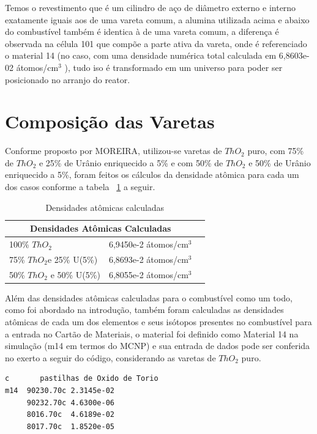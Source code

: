 \documentclass[
	12pt,				%
	openany,			%
	twoside,			%
	a4paper,			%
	english,			%
	french,				%
	spanish,			%
	brazil				%
	]{abntex2}
\begin{document}
Temos o revestimento que é um cilindro de aço de diâmetro externo e interno exatamente iguais aos de uma vareta comum, a alumina utilizada acima e abaixo do combustível também é identica à de uma vareta comum, a diferença é observada na célula 101 que compõe a parte ativa da vareta, onde é referenciado o material 14 (no caso, com uma densidade numérica total calculada em 6,8603e-02 átomos/cm$^3$ ), tudo iso é transformado em um universo para poder ser posicionado no arranjo do reator.

\section{Composição das Varetas}

Conforme proposto por MOREIRA, utilizou-se varetas de $ThO_{2}$ puro,
com 75\% de $ThO_{2}$ e 25\% de Urânio enriquecido a 5\% e com 50\%
de $ThO_{2}$ e 50\% de Urânio enriquecido a 5\%, foram feitos os
cálculos da densidade atômica para cada um dos casos conforme a tabela
~\ref{DENSIDADES_ATOMICAS} a seguir.

\begin{center}
\begin{longtable}{|l|l|l|}
\caption[Densidades atômicas calculadas]{Densidades atômicas calculadas}

\label{DENSIDADES_ATOMICAS} \\

\hline
\multicolumn{2}{|c|}{Densidades Atômicas Calculadas}\tabularnewline
\hline 
\hline 
100\% $ThO_{2}$ & 6,9450e-2 átomos/cm$^3${}\tabularnewline
\hline 
75\% $ThO_{2}$e 25\% U(5\%) & 6,8693e-2 átomos/cm$^3${}\tabularnewline
\hline 
50\% $ThO_{2}$ e 50\% U(5\%) & 6,8055e-2 átomos/cm$^3${}\tabularnewline
\hline 
\end{longtable}
\end{center}

Além das densidades atômicas calculadas para o combustível como um
todo, como foi abordado na introdução, também foram calculadas as
densidades atômicas de cada um dos elementos e seus isótopos presentes
no combustível para a entrada no Cartão de Materiais, o material foi
definido como Material 14 na simulação (m14 em termos do MCNP) e sua
entrada de dados pode ser conferida no exerto a seguir do código,
considerando as varetas de $ThO_{2}$ puro.

\begin{lstlisting}
c       pastilhas de Oxido de Torio 
m14  90230.70c 2.3145e-02 
     90232.70c 4.6300e-06      
     8016.70c  4.6189e-02 
     8017.70c  1.8520e-05
\end{lstlisting}
\end{document}
